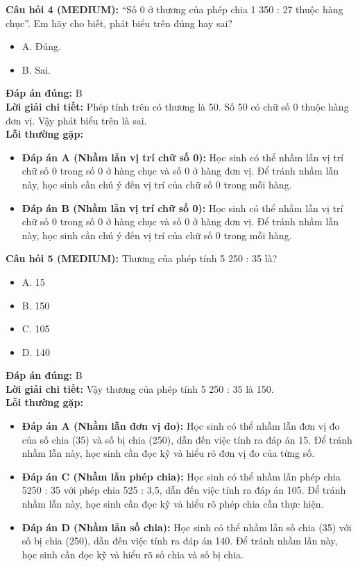 \documentclass{article}
\begin{document}
\begin{minipage}{\textwidth}
\noindent\textbf{Câu hỏi 4 (MEDIUM):} “Số 0 ở thương của phép chia 1 350 : 27 thuộc hàng chục”. Em hãy cho biết, phát biểu trên đúng hay sai? 
\begin{itemize}[label={}]
    \item A. Đúng.
    \item B. Sai.
\end{itemize}
\textbf{Đáp án đúng:} B \\
\textbf{Lời giải chi tiết:} Phép tính trên có thương là 50. Số 50 có chữ số 0 thuộc hàng đơn vị. Vậy phát biểu trên là sai. \\
\textbf{Lỗi thường gặp:}
\begin{itemize}
  \item \textbf{Đáp án A (Nhầm lẫn vị trí chữ số 0):} Học sinh có thể nhầm lẫn vị trí chữ số 0 trong số 0 ở hàng chục và số 0 ở hàng đơn vị. Để tránh nhầm lẫn này, học sinh cần chú ý đến vị trí của chữ số 0 trong mỗi hàng.
  \item \textbf{Đáp án B (Nhầm lẫn vị trí chữ số 0):} Học sinh có thể nhầm lẫn vị trí chữ số 0 trong số 0 ở hàng chục và số 0 ở hàng đơn vị. Để tránh nhầm lẫn này, học sinh cần chú ý đến vị trí của chữ số 0 trong mỗi hàng.
\end{itemize}
\end{minipage}
\vspace{1em}

\begin{minipage}{\textwidth}
\noindent\textbf{Câu hỏi 5 (MEDIUM):} Thương của phép tính 5 250 : 35 là? 
\begin{itemize}[label={}]
    \item A. 15
    \item B. 150
    \item C. 105
    \item D. 140
\end{itemize}
\textbf{Đáp án đúng:} B \\
\textbf{Lời giải chi tiết:} Vậy thương của phép tính 5 250 : 35 là 150. \\
\textbf{Lỗi thường gặp:}
\begin{itemize}
  \item \textbf{Đáp án A (Nhầm lẫn đơn vị đo):} Học sinh có thể nhầm lẫn đơn vị đo của số chia (35) và số bị chia (250), dẫn đến việc tính ra đáp án 15. Để tránh nhầm lẫn này, học sinh cần đọc kỹ và hiểu rõ đơn vị đo của từng số.
  \item \textbf{Đáp án C (Nhầm lẫn phép chia):} Học sinh có thể nhầm lẫn phép chia 5250 : 35 với phép chia 525 : 3,5, dẫn đến việc tính ra đáp án 105. Để tránh nhầm lẫn này, học sinh cần đọc kỹ và hiểu rõ phép chia cần thực hiện.
  \item \textbf{Đáp án D (Nhầm lẫn số chia):} Học sinh có thể nhầm lẫn số chia (35) với số bị chia (250), dẫn đến việc tính ra đáp án 140. Để tránh nhầm lẫn này, học sinh cần đọc kỹ và hiểu rõ số chia và số bị chia.
\end{itemize}
\end{minipage}
\vspace{1em}
\end{document}
